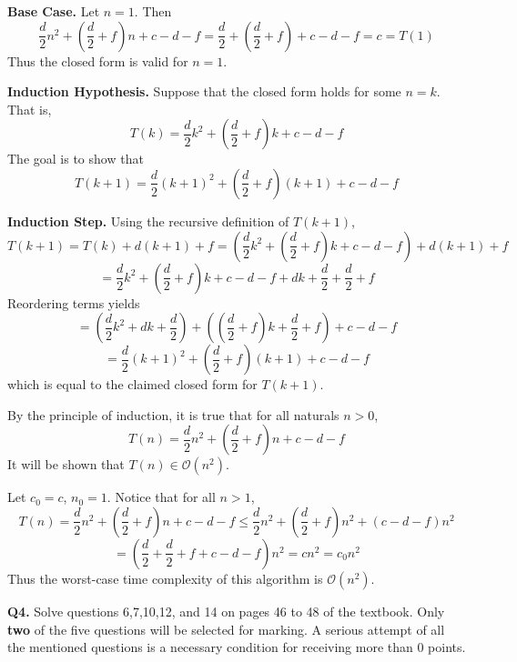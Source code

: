 \documentclass[11pt]{article}
\begin{document}
\begin{enumerate}[label=(\alph*)]
        \textbf{Base Case.} Let \(n=1\). Then
        \[
            \frac{d}{2}n^2 + \left(\frac{d}{2} + f\right)n + c-d-f = \frac{d}{2} + \left(\frac{d}{2} + f\right) + c - d - f = c = T(1)
        \]
        Thus the closed form is valid for \(n=1\).

        \textbf{Induction Hypothesis.} Suppose that the closed form holds for some \(n=k\). That is,
        \[
            T(k) = \frac{d}{2}k^2 + \left(\frac{d}{2} + f\right)k + c-d-f
        \]
        The goal is to show that
        \[
            T(k+1) = \frac{d}{2}(k+1)^2 + \left(\frac{d}{2} + f\right)(k+1) + c - d - f
        \]

        \textbf{Induction Step.} Using the recursive definition of \(T(k+1)\),
        \[
            T(k+1) = T(k) + d(k+1) + f = \left(\frac{d}{2}k^2 + \left(\frac{d}{2} + f\right)k + c-d-f\right) + d(k+1) + f
        \]
        \[
            = \frac{d}{2}k^2 + \left(\frac{d}{2} + f\right)k + c- d - f + dk+\frac{d}{2} + \frac{d}{2} + f
        \]
        Reordering terms yields
        \[
            = \left(\frac{d}{2}k^2 + dk + \frac{d}{2}\right) + \left(\left(\frac{d}{2} + f\right)k + \frac{d}{2} + f\right) + c - d - f
        \]
        \[
            = \frac{d}{2}(k+1)^2 + \left(\frac{d}{2} + f\right)(k+1) + c - d - f
        \]
        which is equal to the claimed closed form for \(T(k+1)\).

        By the principle of induction, it is true that for all naturals \(n >0\),
        \[
            T(n) = \frac{d}{2}n^2 + \left(\frac{d}{2} + f\right)n + c-d-f
        \]
        It will be shown that \(T(n) \in \mathcal{O} (n^2)\).
        
        Let \(c_0 = c\), \(n_0 = 1\). Notice that for all \(n > 1\),
        \[
            T(n) = \frac{d}{2}n^2 + \left(\frac{d}{2} + f\right)n + c-d-f \leq \frac{d}{2}n^2 + \left(\frac{d}{2} + f\right)n^2 + (c-d-f)n^2
        \]
        \[
            = \left(\frac{d}{2} + \frac{d}{2} + f + c - d - f\right)n^2 = c n^2 = c_0 n^2
        \]
        Thus the worst-case time complexity of this algorithm is \(\mathcal{O} (n^2)\).
    \end{enumerate}
    \pagebreak
    \textbf{Q4.} Solve questions 6,7,10,12, and 14 on pages 46 to 48 of the textbook. Only \textbf{two} of the five questions will be selected for marking. A serious attempt of all the mentioned questions is a necessary condition for receiving more than 0 points.
\end{document}
